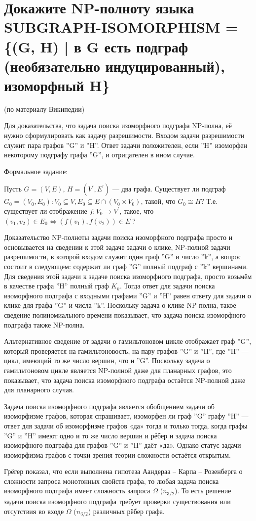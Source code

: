 \documentclass[a4paper,12pt]{article}
\begin{document}
\section{Докажите NP-полноту языка SUBGRAPH-ISOMORPHISM = \{(G, H) | в G есть подграф (необязательно индуцированный), изоморфный H\}}

(по материалу Википедии)

Для доказательства, что задача поиска изоморфного подграфа NP-полна, её нужно сформулировать как задачу разрешимости.  Входом задачи разрешимости служит пара графов ''G'' и ''H''. Ответ задачи положителен, если ''H'' изоморфен некоторому подграфу графа ''G'', и отрицателен в ином случае.

Формальное задание:

Пусть $G=(V,E)$, $H=(V^\prime,E^\prime)$ —  два графа. Существует ли подграф $G_0=(V_0,E_0): V_0\subseteq V, E_0\subseteq E\cap(V_0\times V_0)$, такой, что $G_0\cong H$? Т.е. существует ли отображение $f\colon V_0\rightarrow V^\prime$, такое, что $(v_1,v_2)\in E_0\Leftrightarrow (f(v_1),f(v_2))\in E^\prime$?

Доказательство NP-полноты задачи поиска изоморфного подграфа просто и основывается на сведении к этой задаче задачи о клике, NP-полной задачи разрешимости, в которой входом служит один граф ''G'' и число ''k'', а вопрос состоит в следующем: содержит ли граф ''G'' полный подграф с ''k'' вершинами. Для сведения этой задачи к задаче поиска изоморфного подграфа, просто возьмём в качестве графа ''H'' полный граф $K_k$. Тогда ответ для задачи поиска изоморфного подграфа с входными графами  ''G'' и ''H'' равен ответу для задачи о клике для графа ''G'' и числа ''k''. Поскольку задача о клике NP-полна, такое сведение полиномиального времени показывает, что задача поиска изоморфного подграфа также NP-полна.

Альтернативное сведение от задачи о гамильтоновом цикле отображает граф ''G'', который проверяется на гамильтоновость, на пару графов ''G'' и ''H'', где ''H'' — цикл, имеющий то же число вершин, что и ''G''. Поскольку задача о гамильтоновом цикле является NP-полной даже для планарных графов, это показывает, что задача поиска изоморфного подграфа остаётся NP-полной даже для планарного случая.

Задача поиска изоморфного подграфа является обобщением задачи об изоморфизме графов, которая спрашивает, изоморфен ли граф ''G'' графу ''H'' — ответ для задачи об изоморфизме графов «да» тогда и только тогда, когда графы ''G'' и ''H'' имеют одно и то же число вершин и рёбер и задача поиска изоморфного подграфа для графов  ''G'' и ''H'' даёт «да». Однако статус задачи изоморфизма графов с точки зрения теории сложности остаётся открытым.

Грёгер показал, что если выполнена гипотеза  Аандераа – Карпа – Розенберга о сложности запроса монотонных свойств графа, то любая задача поиска изоморфного подграфа имеет сложность запроса $\Omega$ ($n_{3/2}$). То есть решение задачи поиска изоморфного подграфа требует проверки существования или отсутствия во входе $\Omega$ ($n_{3/2}$) различных рёбер графа.
\end{document}
